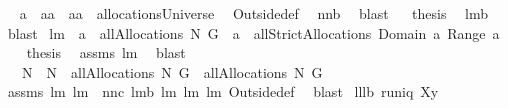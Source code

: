 \begin{isabellebody}
\ \isamarkupfalse%
\ {\isachardoublequoteopen}a\ {\isasymsubseteq}\ aa\ {\isacharampersand}\ aa\ {\isasymin}\ allocationsUniverse{\isachardoublequoteclose}\ \isamarkupfalse%
\ Outside{\isacharunderscore}def\ \isamarkupfalse%
\ nn{}{}b\ \isamarkupfalse%
\ blast\isanewline
{}\isamarkupfalse%
\ \isamarkupfalse%
\ {\isacharquery}thesis\ \isamarkupfalse%
\ lm{}{}b\ \isamarkupfalse%
\ blast\isanewline
{}\isamarkupfalse%
%
\endisatagproof
{\isafoldproof}%
%
\isadelimproof
\isanewline
%
\endisadelimproof
{}\isamarkupfalse%
\ lm{}{}{\isacharcolon}\ \ {\isachardoublequoteopen}a\ {\isasymin}\ allAllocations{\isacharprime}\ N\ G{\isachardoublequoteclose}\ \ {\isachardoublequoteopen}a\ {\isasymin}\ allStrictAllocations{\isacharprime}{\isacharprime}{\isacharprime}\ {\isacharparenleft}Domain\ a{\isacharparenright}\ {\isacharparenleft}{\isasymUnion}Range\ a{\isacharparenright}{\isachardoublequoteclose}\isanewline
%
\isadelimproof
%
\endisadelimproof
%
\isatagproof
{}\isamarkupfalse%
\ {\isacharminus}\ \isamarkupfalse%
\ {\isacharquery}thesis\ \isamarkupfalse%
\ assms\ lm{}{}\ \isamarkupfalse%
\ blast\ \isamarkupfalse%
%
\endisatagproof
{\isafoldproof}%
%
\isadelimproof
\isanewline
%
\endisadelimproof
{}\isamarkupfalse%
\ \ \ {\isachardoublequoteopen}N{}\ {\isasymsubseteq}\ N{}{\isachardoublequoteclose}\ \ {\isachardoublequoteopen}allAllocations{\isacharprime}{\isacharprime}{\isacharprime}\ N{}\ G\ {\isasymsubseteq}\ allAllocations{\isacharprime}{\isacharprime}{\isacharprime}\ N{}\ G{\isachardoublequoteclose}\isanewline
%
\isadelimproof
%
\endisadelimproof
%
\isatagproof
{}\isamarkupfalse%
\ assms\ lm{}{}\ lm{}{}\ \ nn{}{}c\ lm{}{}b\ lm{}{}\ lm{}{}\ lm{}{}\ Outside{\isacharunderscore}def\ \isamarkupfalse%
\ blast%
\endisatagproof
{\isafoldproof}%
%
\isadelimproof
\isanewline
%
\endisadelimproof
\isanewline
{}\isamarkupfalse%
\ lll{}{}b{\isacharcolon}\ {\isachardoublequoteopen}runiq\ {\isacharparenleft}X{\isasymtimes}{\isacharbraceleft}y{\isacharbraceright}{\isacharparenright}{\isachardoublequoteclose}%

\end{isabellebody}
